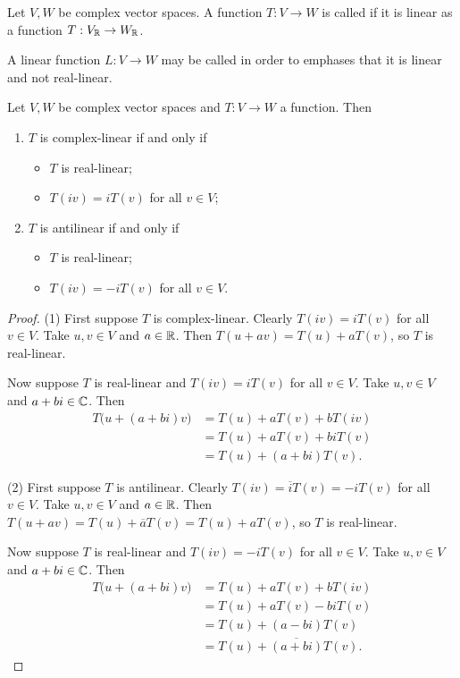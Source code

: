 \begin{definition}
Let $V,W$ be complex vector spaces. A function $T: V\to W$ is called  if it is linear as a function $T: V_{\mathbb{R}} \to W_{\mathbb{R}}$.

A linear function $L: V\to W$ may be called  in order to emphases that it is linear and not real-linear.
\end{definition}

\begin{lemma} \label{complexLinearAntilinearRealLinear}
Let $V,W$ be complex vector spaces and $T:V\to W$ a function. Then
\begin{enumerate}
\item $T$ is complex-linear \textup{if and only if}
\begin{itemize}
\item $T$ is real-linear;
\item $T(iv) = iT(v)$ for all $v\in V$;
\end{itemize}
\item $T$ is antilinear \textup{if and only if}
\begin{itemize}
\item $T$ is real-linear;
\item $T(iv) = -iT(v)$ for all $v\in V$.
\end{itemize}
\end{enumerate}
\end{lemma}
\begin{proof}
(1) First suppose $T$ is complex-linear. Clearly $T(iv) = iT(v)$ for all $v\in V$. Take $u,v\in V$ and $a\in \mathbb{R}$. Then $T(u+av) = T(u)+aT(v)$, so $T$ is real-linear.

Now suppose $T$ is real-linear and $T(iv) = iT(v)$ for all $v\in V$. Take $u,v\in V$ and $a+bi\in \mathbb{C}$. Then
\begin{align*}
T\big(u+ (a+bi)v\big) &= T(u) + aT(v) + bT(iv) \\
&= T(u) + aT(v) + biT(v) \\
&= T(u) + (a+bi)T(v). 
\end{align*}

(2) First suppose $T$ is antilinear. Clearly $T(iv) = \overline{i}T(v) = -iT(v)$ for all $v\in V$. Take $u,v\in V$ and $a\in \mathbb{R}$. Then $T(u+av) = T(u)+\overline{a}T(v) = T(u) + aT(v)$, so $T$ is real-linear.

Now suppose $T$ is real-linear and $T(iv) = -iT(v)$ for all $v\in V$. Take $u,v\in V$ and $a+bi\in \mathbb{C}$. Then
\begin{align*}
T\big(u+ (a+bi)v\big) &= T(u) + aT(v) + bT(iv) \\
&= T(u) + aT(v) - biT(v) \\
&= T(u) + (a - bi)T(v) \\
&= T(u) + \overline{(a+bi)}T(v). 
\end{align*}
\end{proof}

